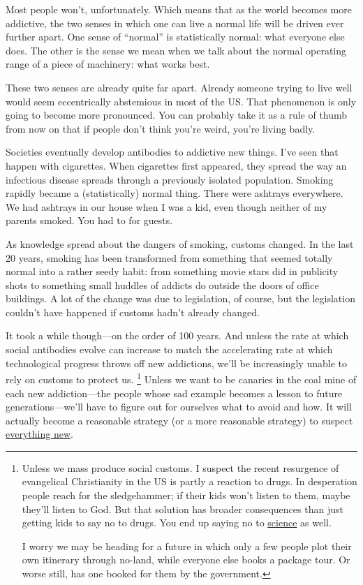 \documentclass[12pt]{book}
\begin{document}
Most people won't, unfortunately. Which means that as the world becomes
more addictive, the two senses in which one can live a normal life will
be driven ever further apart. One sense of ``normal'' is statistically
normal: what everyone else does. The other is the sense we mean when we
talk about the normal operating range of a piece of machinery: what
works best.

These two senses are already quite far apart. Already someone trying to
live well would seem eccentrically abstemious in most of the US. That
phenomenon is only going to become more pronounced. You can probably
take it as a rule of thumb from now on that if people don't think you're
weird, you're living badly.

Societies eventually develop antibodies to addictive new things. I've
seen that happen with cigarettes. When cigarettes first appeared, they
spread the way an infectious disease spreads through a previously
isolated population. Smoking rapidly became a (statistically) normal
thing. There were ashtrays everywhere. We had ashtrays in our house when
I was a kid, even though neither of my parents smoked. You had to for
guests.

As knowledge spread about the dangers of smoking, customs changed. In
the last 20 years, smoking has been transformed from something that
seemed totally normal into a rather seedy habit: from something movie
stars did in publicity shots to something small huddles of addicts do
outside the doors of office buildings. A lot of the change was due to
legislation, of course, but the legislation couldn't have happened if
customs hadn't already changed.

It took a while though---on the order of 100 years. And unless the rate
at which social antibodies evolve can increase to match the accelerating
rate at which technological progress throws off new addictions, we'll be
increasingly unable to rely on customs to protect us.
\footnote{Unless we mass produce social customs. I suspect the recent
resurgence of evangelical Christianity in the US is partly a reaction to
drugs. In desperation people reach for the sledgehammer; if their kids
won't listen to them, maybe they'll listen to God. But that solution has
broader consequences than just getting kids to say no to drugs. You end
up saying no to
\href{https://www.youtube.com/watch?v=GbXgsMxOPtI}{science} as well.

I worry we may be heading for a future in which only a few people plot
their own itinerary through no-land, while everyone else books a package
tour. Or worse still, has one booked for them by the government.} Unless we want to be canaries in the coal mine
of each new addiction---the people whose sad example becomes a lesson to
future generations---we'll have to figure out for ourselves what to
avoid and how. It will actually become a reasonable strategy (or a more
reasonable strategy) to suspect
\href{http://en.wikipedia.org/wiki/Paleolithic_diet}{everything new}.
\end{document}
